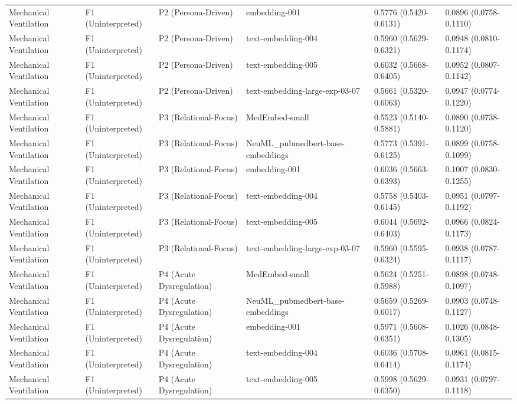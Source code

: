 \documentclass[border=0pt]{standalone}
\begin{document}
\begin{adjustbox}{width=\textwidth}
\begin{tabular}{llllll}
Mechanical Ventilation & F1 (Uninterpreted) & P2 (Persona-Driven) & embedding-001 & 0.5776 (0.5420-0.6131) & 0.0896 (0.0758-0.1110) \\
Mechanical Ventilation & F1 (Uninterpreted) & P2 (Persona-Driven) & text-embedding-004 & 0.5960 (0.5629-0.6321) & 0.0948 (0.0810-0.1174) \\
Mechanical Ventilation & F1 (Uninterpreted) & P2 (Persona-Driven) & text-embedding-005 & 0.6032 (0.5668-0.6405) & 0.0952 (0.0807-0.1142) \\
Mechanical Ventilation & F1 (Uninterpreted) & P2 (Persona-Driven) & text-embedding-large-exp-03-07 & 0.5661 (0.5320-0.6063) & 0.0947 (0.0774-0.1220) \\
Mechanical Ventilation & F1 (Uninterpreted) & P3 (Relational-Focus) & MedEmbed-small & 0.5523 (0.5140-0.5881) & 0.0890 (0.0738-0.1120) \\
Mechanical Ventilation & F1 (Uninterpreted) & P3 (Relational-Focus) & NeuML\_pubmedbert-base-embeddings & 0.5773 (0.5391-0.6125) & 0.0899 (0.0758-0.1099) \\
Mechanical Ventilation & F1 (Uninterpreted) & P3 (Relational-Focus) & embedding-001 & 0.6036 (0.5663-0.6393) & 0.1007 (0.0830-0.1255) \\
Mechanical Ventilation & F1 (Uninterpreted) & P3 (Relational-Focus) & text-embedding-004 & 0.5758 (0.5403-0.6145) & 0.0951 (0.0797-0.1192) \\
Mechanical Ventilation & F1 (Uninterpreted) & P3 (Relational-Focus) & text-embedding-005 & 0.6044 (0.5692-0.6403) & 0.0966 (0.0824-0.1173) \\
Mechanical Ventilation & F1 (Uninterpreted) & P3 (Relational-Focus) & text-embedding-large-exp-03-07 & 0.5960 (0.5595-0.6324) & 0.0938 (0.0787-0.1117) \\
Mechanical Ventilation & F1 (Uninterpreted) & P4 (Acute Dysregulation) & MedEmbed-small & 0.5624 (0.5251-0.5988) & 0.0898 (0.0748-0.1097) \\
Mechanical Ventilation & F1 (Uninterpreted) & P4 (Acute Dysregulation) & NeuML\_pubmedbert-base-embeddings & 0.5659 (0.5269-0.6017) & 0.0903 (0.0748-0.1127) \\
Mechanical Ventilation & F1 (Uninterpreted) & P4 (Acute Dysregulation) & embedding-001 & 0.5971 (0.5608-0.6351) & 0.1026 (0.0848-0.1305) \\
Mechanical Ventilation & F1 (Uninterpreted) & P4 (Acute Dysregulation) & text-embedding-004 & 0.6036 (0.5708-0.6414) & 0.0961 (0.0815-0.1174) \\
Mechanical Ventilation & F1 (Uninterpreted) & P4 (Acute Dysregulation) & text-embedding-005 & 0.5998 (0.5629-0.6350) & 0.0931 (0.0797-0.1118) \\

\end{tabular}
\end{adjustbox}
\end{document}
